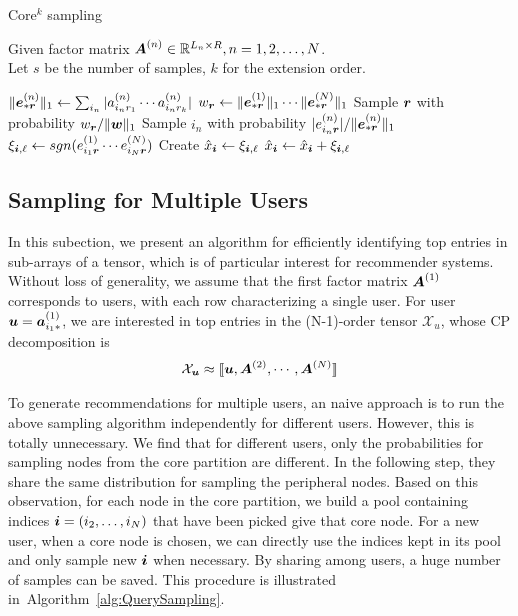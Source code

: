 \documentclass[letterpaper]{article}
\newcommand{\Sca}[3]{{#1}^{(#2)}_{i_#2#3}}%
\newcommand{\anr}[2]{\Sca{a}{#1}{#2}}
\newcommand{\enr}[2]{\Sca{e}{#1}{\V{#2}}}
\newcommand{\score}[1]{\xi_{\V{i},#1}}
\newcommand{\T}[1]{\mathcal{#1}}
\newcommand{\KT}[1]{\llbracket #1 \rrbracket}
\newcommand{\V}[1]{{\boldsymbol{{\MakeLowercase{#1}}}}}
\newcommand{\ColVec}[3]{\V{#1}^{(#2)}_{#3}}
\newcommand{\NormColE}[2]{\norm{\ColVec{e}{#1}{*\V{#2}}}{1}}
\newcommand{\RowVecA}[1]{\V{a}^{(#1)}_{i_#1*}}
\newcommand{\coord}{(i_1,i_2,\ldots,i_N)}
\newcommand{\predx}{\hat{x}_{\V{i}}}
\newcommand{\M}[1]{{\boldsymbol{{\MakeUppercase{#1}}}}}
\newcommand{\FacMat}[2]{\M{#1}^{(#2)}}
\newcommand{\norm}[2]{\|#1\|_{#2}}
\newcommand{\Alg}[1]{Algorithm~\ref{alg:#1}}
\begin{document}
\begin{algorithm}[!ht]
    \caption{Core$^k$ sampling}
    \label{alg:CoreExtensionSampling}
    Given factor matrix $\FacMat{A}{n}\in \mathbb{R}^{L_n\times R}, n = 1,2,\ldots,N$.\\
    Let $s$ be the number of samples, $k$ for the extension order.
    \begin{algorithmic}[1]
    \For{$\V{r}\in{\underbrace{R\times \cdots \times R}_{k}}$}
    \State $\NormColE{n}{r} \leftarrow \sum_{i_n}|\anr{n}{r_1}\cdots\anr{n}{r_k}|$
    \EndFor
    \State $w_{\V{r}} \leftarrow \NormColE{1}{r} \cdots \NormColE{N}{r} $
    \EndFor
    \State Sample $\V{r}$ with probability $w_\V{r}/\norm{\V{W}}{1}$
    \label{line:nodes}
    \State Sample $i_n$ with probability $|\enr{n}{r}|/\NormColE{n}{r}$
    \EndFor
    \State
        $\score{\ell} \leftarrow sgn(\enr{1}{r}\cdots\enr{N}{r})$
    \If {$\V{i}=\coord$ has not been sampled}
    \State  Create $\predx \leftarrow \score{\ell} $
    \Else
    \State $\predx \leftarrow \predx + \score{\ell}$
    \EndIf
    \EndFor
    \end{algorithmic}
\end{algorithm}

\subsection{Sampling for Multiple Users}
In this subection, 
we present an algorithm for efficiently identifying top entries in sub-arrays of a tensor,
which is of particular interest for recommender systems. 
Without loss of generality, 
we assume that the first factor matrix $\FacMat{A}{1}$ corresponds to users, 
with each row characterizing a single user. 
For user $\V{u} = \RowVecA{1}$, 
we are interested in top entries in the (N-1)-order tensor $\T{X}_u$,
whose CP decomposition is
\begin{align}
    \T{X}_{\V{u}} \approx \KT{\V{u},\FacMat{A}{2},\cdots,\FacMat{A}{N}} 
\end{align}

To generate recommendations for multiple users, 
an naive approach is to run the above sampling algorithm independently for different users. 
However, this is totally unnecessary. 
We find that for different users, 
only the probabilities for sampling nodes from the core partition are different. 
In the following step, they share the same distribution for sampling the peripheral nodes. 
Based on this observation, for each node in the core partition, 
we build a pool containing indices $\V{i}=(i_2,\ldots,i_N)$ that have been picked give that core node. 
For a new user, when a core node is chosen, 
we can directly use the indices kept in its pool and only sample new $\V{i}$ when necessary. 
By sharing among users, a huge number of samples can be saved. 
This procedure is illustrated in~\Alg{QuerySampling}.
\end{document}
